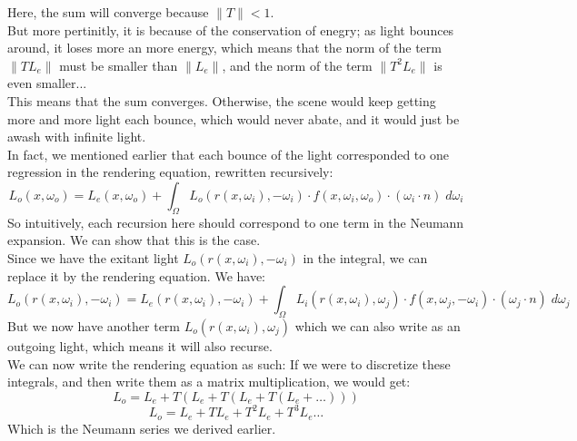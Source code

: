\documentclass[12pt]{article}
\begin{document}
Here, the sum will converge because $\|T\| < 1$. \\
But more pertinitly, it is because of the conservation
of enegry; as light bounces around,
it loses more an more energy, which
means that the norm of the term $\|T L_e\|$
must be smaller than $\|L_e\|$,
and the norm of the term $\|T^2 L_e\|$ is even smaller... \\
This means that the sum converges.
Otherwise, the scene would keep getting more and more
light each bounce, which would never abate,
and it would just be awash with infinite light. \\

In fact, we mentioned earlier that each bounce of
the light corresponded to one regression in the rendering
equation, rewritten recursively:
\[ L_{o}(x, \omega_o)
= L_{e}(x, \omega_o)
+ \int_\Omega L_o(r(x, \omega_i), -\omega_i)  \cdot
f(x, \omega_i, \omega_o) \cdot
(\omega_i \cdot n) \; d\omega_i \]
So intuitively, each recursion here should correspond
to one term in the Neumann expansion.
We can show that this is the case. \\
Since we have the exitant light 
$L_o(r(x, \omega_i), -\omega_i)$
in the integral, we can replace it
by the rendering equation.
We have:
\[ L_o(r(x, \omega_i), -\omega_i)
= L_{e}(r(x, \omega_i), -\omega_i)
+ \int_\Omega L_i(r(x, \omega_i), \omega_j) \cdot
f(x, \omega_j, -\omega_i) \cdot
(\omega_j \cdot n) \; d\omega_j \]
But we now have another term
$L_o(r(x, \omega_i), \omega_j)$
which we can also write as an outgoing light,
which means it will also recurse. \\
We can now write the rendering equation as such:
If we were to discretize these integrals,
and then write them as a matrix multiplication,
we would get:
\[ L_o = L_e + T( L_e + T( L_e + T (L_e + \dots))) \]
\[ L_o = L_e + TL_e + T^2L_e + T^3L_e \dots \]
Which is the Neumann series we derived earlier. \\



\newpage
\end{document}
